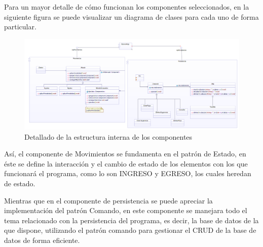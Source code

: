 Para un mayor detalle de cómo funcionan los componentes seleccionados, en la siguiente figura se puede visualizar un diagrama de clases para cada uno de forma particular.

\begin{figure}[H]
	\centering
	\includegraphics[width=1\linewidth]{parte2/imgs/DiagramaDeComponentes/apiDetallado}
	\caption{Detallado de la estructura interna de los componentes}
	\label{fig:apidetallado}
\end{figure}

Así, el componente de Movimientos se fundamenta en el patrón de Estado, en éste se define la interacción y el cambio de estado de los elementos con los que funcionará el programa, como lo son INGRESO y EGRESO, los cuales heredan de estado. 	

Mientras que en el componente de persistencia se puede apreciar la implementación del patrón Comando, en este componente se manejara todo el tema relacionado con la persistencia del programa, es decir, la base de datos de la que dispone, utilizando el patrón comando para gestionar el CRUD de la base de datos de forma eficiente. 